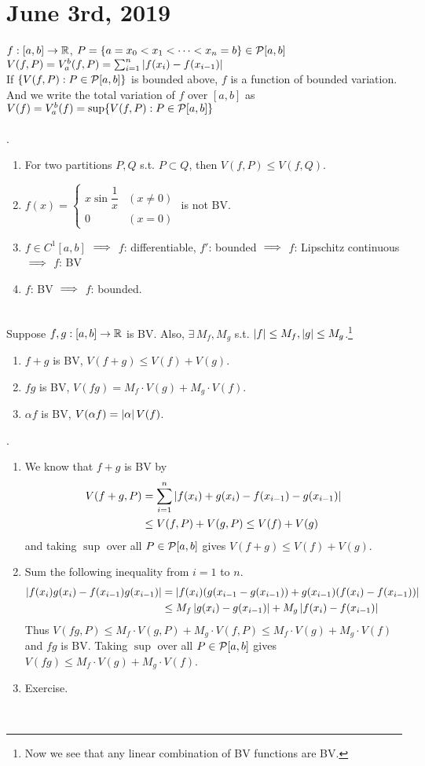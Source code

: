 \section*{June 3rd, 2019}
$f:[a, b]\rightarrow\mathbb{R}$, $P = \{a=x_0 < x_1 < \cdots < x_n=b\}\in\mathcal{P}[a, b]$\\
$V(f, P) = V_a^b(f, P) = \sum_{i=1}^{n} \left|f(x_i)-f(x_{i-1})\right|$\\
If $\{V(f, P): P\in \mathcal{P}[a, b] \}$ is bounded above, $f$ is a function of bounded variation. And we write the total variation of $f$ over $[a, b]$ as $V(f) = V_a^b (f) = \sup \{V(f, P): P\in \mathcal{P}[a, b] \}$\\
\\
\rmk.
\begin{enumerate}
	\item For two partitions $P, Q$ s.t. $P\subset Q$, then $V(f, P) \leq V(f, Q)$.
	\item $f(x) = \begin{cases}
		x\sin \dfrac{1}{x} &(x\neq 0) \\ 0  &(x = 0)
	\end{cases}$ is not BV.
	\item $f\in C^1[a, b]$ $\implies$ $f$: differentiable, $f'$: bounded $\implies$ $f$: Lipschitz continuous $\implies$ $f$: BV
	\item $f$: BV $\implies$ $f$: bounded.
\end{enumerate}~\\
 Suppose $f, g:[a, b]\rightarrow\mathbb{R}$ is BV. Also, $\exists\, M_f, M_g$ s.t. $\left|f\right| \leq M_f, \left|g\right|\leq M_g$.\footnote{Now we see that any linear combination of BV functions are BV.}
\begin{enumerate}
	\item $f+g$ is BV, $V(f+g) \leq V(f) + V(g)$.
	\item $fg$ is BV, $V(fg) = M_f \cdot V(g) + M_g\cdot V(f)$.
	\item $\alpha f$ is BV, $V(\alpha f) = \left|\alpha\right|V(f)$.
\end{enumerate}
\pf.
\begin{enumerate}
	\item We know that $f+g$ is BV by $$\begin{aligned}
	V(f + g, P) &= \sum_{i=1}^n \left|f(x_i) + g(x_i) - f(x_{i-1}) - g(x_{i-1})\right| \\&\leq V(f, P) + V(g, P)
	\leq V(f) + V(g)
	\end{aligned}$$
	and taking $\sup$ over all $P\in\mathcal{P}[a, b]$ gives $V(f+g)\leq V(f)+V(g)$.
	\item Sum the following inequality from $i=1$ to $n$.
	$$\begin{aligned}
		\left|f(x_i)g(x_i) - f(x_{i-1})g(x_{i-1})\right| &= \left|f(x_i)(g(x_{i-1}-g(x_{i-1})) + g(x_{i-1})(f(x_{i}) - f(x_{i-1}))\right| \\&\leq M_f \left|g(x_i) - g(x_{i-1})\right| + M_g \left|f(x_i)-f(x_{i-1})\right|
	\end{aligned}
	$$
	Thus $V(fg, P)\leq M_f \cdot V(g, P) + M_g \cdot V(f, P) \leq M_f \cdot V(g) + M_g \cdot V(f)$ and $fg$ is BV. Taking $\sup$ over all $P\in\mathcal{P}[a, b]$ gives $V(fg)\leq M_f \cdot V(g) + M_g \cdot V(f)$.
	\item Exercise.
\end{enumerate}~\\
